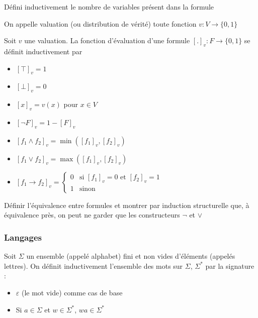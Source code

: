 \begin{exercise}
	Défini inductivement le nombre de variables présent dans la formule
\end{exercise}

\begin{definition}
	On appelle valuation (ou distribution de vérité) toute fonction $v : V \to \{0, 1\}$
\end{definition}

\begin{definition} Soit $v$ une valuation. La fonction d'évaluation d'une formule $[.]_v : F \to \{0,1\}$ se définit inductivement par \begin{itemize}[label=$\bullet$]
		\item $[\top]_v = 1$
		\item $[\bot]_v = 0$
		\item $[x]_v = v(x)$ pour $x \in V$
		\item $[\neg F]_v = 1 - [F]_v$
		\item $[f_1 \wedge f_2]_v = \min([f_1]_v, [f_2]_v)$
		\item $[f_1 \vee f_2]_v = \max([f_1]_v, [f_2]_v)$
		\item $[f_1 \to f_2]_v = \left\{ \begin{array}{ll}
			0 & \text{si } [f_1]_v = 0 \text{ et } [f_2]_v = 1\\
			1 & \text{sinon}
		\end{array} \right.$
\end{itemize}
\end{definition}

\begin{exercise}
	Définir l'équivalence entre formules et montrer par induction structurelle que, à équivalence près, on peut ne garder que les constructeurs $\neg$ et $\vee$
\end{exercise}

\subsubsection{Langages}

\begin{definition}
	Soit $\Sigma$ un ensemble (appelé alphabet) fini et non vides d'éléments (appelés lettres). On définit inductivement l'ensemble des mots sur $\Sigma$, $\Sigma^*$ par la signature : \begin{itemize}
		\item $\varepsilon$ (le mot vide) comme cas de base
		\item Si $a \in \Sigma$ et $w \in \Sigma^*$, $wa\in \Sigma^*$
	\end{itemize}
\end{definition}

